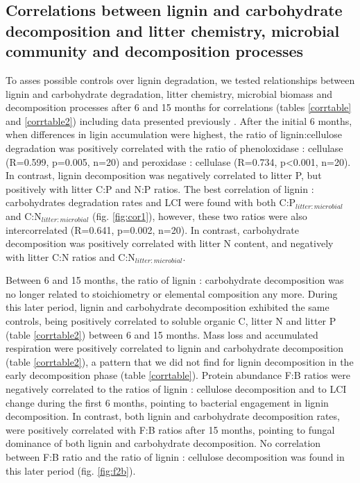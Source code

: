 \subsection*{Correlations between lignin and carbohydrate decomposition and litter chemistry, microbial community and decomposition processes}

To asses possible controls over lignin degradation, we tested relationships between lignin and carbohydrate degradation, litter chemistry, microbial biomass and decomposition processes after 6 and 15 months for correlations (tables \ref{corrtable} and \ref{corrtable2}) including data presented previously \cite{Mooshammer2011, Leitner2011}. 
After the initial 6 months, when differences in ligin accumulation were highest, the ratio of lignin:cellulose degradation was positively correlated with the ratio of phenoloxidase : cellulase (R=0.599, p=0.005, n=20) and peroxidase : cellulase (R=0.734,  p\textless 0.001, n=20). In contrast, lignin decomposition was negatively correlated to litter P, but positively with litter C:P and N:P ratios. The best correlation of lignin : carbohydrates degradation rates and LCI were found with both C:P$_{litter : microbial}$ and C:N$_{litter : microbial}$ (fig. \ref{fig:cor1}), however, these two ratios were also intercorrelated (R=0.641, p=0.002, n=20). In contrast, carbohydrate decomposition was positively correlated with litter N content, and negatively with litter C:N ratios and C:N$_{litter : microbial}$.

Between 6 and 15 months, the ratio of lignin : carbohydrate decomposition was no longer related to stoichiometry or elemental composition any more. During this later period, lignin and carbohydrate decomposition exhibited the same controls, being positively correlated to soluble organic C, litter N and litter P (table \ref{corrtable2}) between 6 and 15 months. Mass loss and accumulated respiration were positively correlated to lignin and carbohydrate decomposition (table \ref{corrtable2}), a pattern that we did not find for lignin decomposition in the early decomposition phase (table \ref{corrtable}). Protein abundance F:B ratios were negatively correlated to the ratios of lignin : cellulose decomposition and to LCI change during the first 6 months, pointing to bacterial engagement in lignin decomposition. In contrast, both lignin and carbohydrate decomposition rates, were positively correlated with F:B ratios after 15 months, pointing to fungal dominance of both lignin and carbohydrate decomposition. No correlation between F:B ratio and the ratio of lignin : cellulose decomposition was found in this later period (fig. \ref{fig:f2b}).

